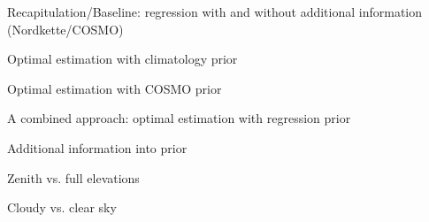 Recapitulation/Baseline: regression with and without additional information (Nordkette/COSMO)

Optimal estimation with climatology prior

Optimal estimation with COSMO prior

A combined approach: optimal estimation with regression prior

Additional information into prior

Zenith vs. full elevations

Cloudy vs. clear sky
